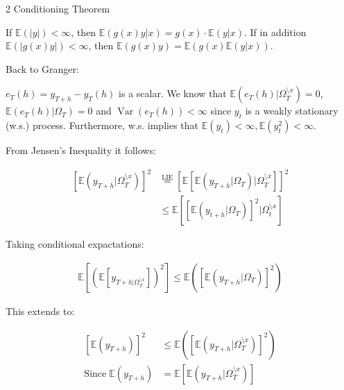 \documentclass[12pt,a4paper]{article}
\newcommand{\Var}{\operatorname{Var}} %
\begin{document}
2 Conditioning Theorem

If \(\mathbb{E}(|y|) < \infty\), then
\(\mathbb{E}(g(x) y | x) = g(x) \cdot \mathbb{E}(y|x)\). If in addition
\(\mathbb{E} (|g(x) y|) < \infty\), then
\(\mathbb{E} (g(x) y) = \mathbb{E} (g(x) \mathbb{E} (y|x))\).

Back to Granger:

\(e_T (h) = y_{T +h} - y_T (h)\) is a scalar. We know that
\(\mathbb{E} \left( e_T (h) | \Omega_T^{ \setminus x} \right) = 0\),
\(\mathbb{E} \left( e_T (h) | \Omega_T \right) = 0\) and
\(\Var(e_T (h)) < \infty\) since \(y_t\) is a weakly stationary (w.s.)
process. Furthermore, w.s. implies that
\(\mathbb{E} (y_t) < \infty, \mathbb{E} (y_t^2) < \infty\).

From Jensen's Inequality it follows:

\begin{align*}
  \left[ \mathbb{E} \left( y_{T + h} | \Omega_{T}^{\setminus x } \right) \right]^2 & \overset{\text{LIE}}{=} \left[ \mathbb{E} \left[ \mathbb{E} \left( y_{T + h} | \Omega_{T} \right) | \Omega_T^{\setminus x} \right] \right]^2 \\
  & \leq \mathbb{E} \left[ \left[ \mathbb{E} (y_{t +h} | \Omega_T)\right]^2 | \Omega_{t}^{\setminus x} \right]
\end{align*}

Taking conditional expactations:

\begin{align*}
  \mathbb{E} \left[ \left( \mathbb{E}\left[ y_{T + h | \Omega_{T}^{\setminus x}} \right]  \right)^2 \right] \leq \mathbb{E} \left( \left[ \mathbb{E} \left( y_{T +h} | \Omega_T \right) \right]^2 \right)
\end{align*}

This extends to:

\begin{align*}
  \left[ \mathbb{E} (y_{T + h}) \right]^2 & \leq \mathbb{E}  \left( \left[ \mathbb{E} \left( y_{T + h} | \Omega_T^{\setminus x} \right) \right]^2 \right)\\
  \text{Since} \; \mathbb{E} (y_{T + h}) & = \mathbb{E} \left[ \mathbb{E} \left( y_{T +h} | \Omega_{T}^{\setminus x}\right) \right]
\end{align*}
\end{document}
